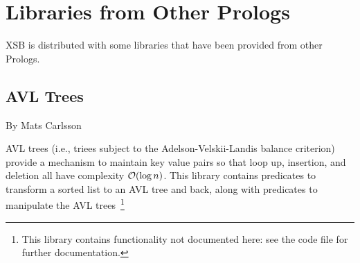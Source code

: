 \chapter{Libraries from Other Prologs}

XSB is distributed with some libraries that have been provided from
other Prologs.

%
%
%
%
\section{AVL Trees}

By Mats Carlsson

AVL trees (i.e., triees subject to the Adelson-Velskii-Landis balance
criterion) provide a mechanism to maintain key value pairs so that
loop up, insertion, and deletion all have complexity ${\cal O}(\log
n)$.  This library contains predicates to transform a sorted list to
an AVL tree and back, along with predicates to manipulate the AVL
trees~\footnote{This library contains functionality not documented
  here: see the code file for further documentation.}

